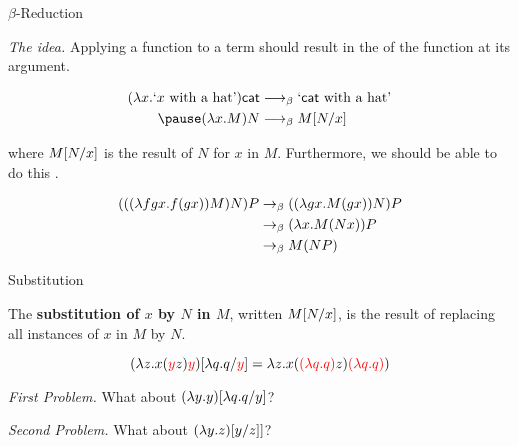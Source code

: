 \documentclass[10pt]{beamer}
\begin{document}
\begin{frame}{$\beta$-Reduction}

\textit{The idea.} Applying a function to a term should result in the  of the function  at its argument.
\nxt

\begin{align*}
(\lambda x . \text{`$x$ with a hat'})\mathsf{cat} &\longrightarrow_\beta
\text{`$\mathsf{cat}$ with a hat'} \\
\pause
(\lambda x . M) N &\longrightarrow_\beta \sub M N x
\end{align*}

where $M[N/x]$ is the result of  $N$ for $x$ in $M$. Furthermore, we should be able to do this .
\nxt

\begin{example}
\vspace{-.75cm}
\begin{align*}
(((\lambda fgx . f(gx))M)N)P
&\rightarrow_\beta ((\lambda gx . M(gx))N)P \\
&\rightarrow_\beta (\lambda x . M(Nx))P \\
&\rightarrow_\beta M (N P)
\end{align*}
\end{example}
\end{frame}

\begin{frame}{Substitution}

\begin{definition}
The \textbf{substitution of $x$ by $N$ in $M$}, written $M[N/x]$, is the result of replacing all instances of $x$ in $M$ by $N$.
\end{definition}
\vfill

\begin{example}
\begin{displaymath}
(\lambda z . x (\textcolor{red}{y} z)\textcolor{red}{y})[\lambda q . q/\textcolor{red}{y}] = \lambda z . x (\textcolor{red}{(\lambda q . q)} z)\textcolor{red}{(\lambda q . q)})
\end{displaymath}
\end{example}
\nxt

\textit{First Problem.} What about $(\lambda y . y)[\lambda q . q/y]$?
\smallskip\pause

\textit{Second Problem.} What about $(\lambda y. z)[y/z]]$?

\end{frame}
\end{document}
